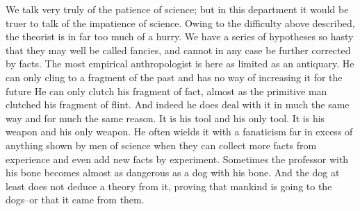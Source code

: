 We talk very truly of the patience of science; but in this department it would be truer to talk of the impatience of science. Owing to the difficulty above described, the theorist is in far too much of a hurry. We have a series of hypotheses so hasty that they may well be called fancies, and cannot in any case be further corrected by facts. The most empirical anthropologist is here as limited as an antiquary. He can only cling to a fragment of the past and has no way of increasing it for the future He can only clutch his fragment of fact, almost as the primitive man clutched his fragment of flint. And indeed he does deal with it in much the same way and for much the same reason. It is his tool and his only tool. It is his weapon and his only weapon. He often wields it with a fanaticism far in excess of anything shown by men of science when they can collect more facts from experience and even add new facts by experiment. Sometimes the professor with his bone becomes almost as dangerous as a dog with his bone. And the dog at least does not deduce a theory from it, proving that mankind is going to the dogs--or that it came from them.

